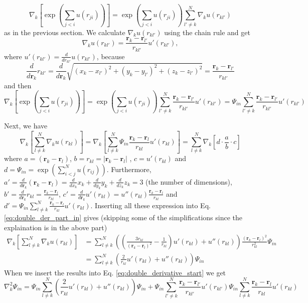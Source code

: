 $$\nabla_k\left[ \exp{\left(\sum_{j<i}u(r_{ji})\right)}\right]=  \exp{\left(\sum_{j<i}u(r_{ji})\right)} \sum^N_{l' \neq k} \nabla_k u (r_{kl'})$$ as in the previous section. We calculate $ \nabla_k u(r_{kl'})$ using the chain rule and get
$$ \nabla_k u(r_{kl'})  = \frac{\mathbf{r}_k - \mathbf{r}_{l'}}{r_{kl'}} u'(r_{kl'}), $$ where $u'(r_{kl'}) = \frac{d}{dr_{kl'}}u(r_{kl'})$, because $$\frac{d}{d\mathbf{r}_{k}}r_{kl'} =\frac{d}{d\mathbf{r}_k}\sqrt{(x_k-x_{l'})^2 + (y_k-y_{l'})^2 + (z_k-z_{l'})^2} = \frac{\mathbf{r}_k - \mathbf{r}_{l'}}{r_{kl'}} $$ and then
$$\nabla_k\left[ \exp{\left(\sum_{j<i}u(r_{ji})\right)}\right]=  \exp{\left(\sum_{j<i}u(r_{ji})\right)} \sum^N_{l' \neq k} \frac{\mathbf{r}_k - \mathbf{r}_{l'}}{r_{kl'}} u'(r_{kl'}) = \Psi_{in} \sum^N_{l' \neq k} \frac{\mathbf{r}_k - \mathbf{r}_{l'}}{r_{kl'}} u'(r_{kl'})  $$

Next, we have
\begin{equation}\label{eq:double_der_part_in}
\nabla_k\left[ \sum^N_{l \neq k} \nabla_k u (r_{kl})\right] = \nabla_k \left[ \sum^N_{l \neq k}  \Psi_{in} \frac{\mathbf{r}_k - \mathbf{r}_{l}}{r_{kl}} u'(r_{kl}) \right] = \sum^N_{l \neq k} \nabla_k \left[ d \cdot \frac{a}{b} \cdot c \right]
\end{equation}
where $a = \left(\mathbf{r}_k-\mathbf{r}_{l}\right)$, $b= r_{kl}=|\mathbf{r}_k-\mathbf{r}_{l}|$ , $c = u'(r_{kl})$ and $d = \Psi_{in}= \exp\left(\sum_{i<j}^N u(r_{ij})\right)$. Furthermore, $a' = \frac{d}{d\mathbf{r}_k} \left(\mathbf{r}_k-\mathbf{r}_{l}\right) = \frac{d}{dx_k} x_k  + \frac{d}{dy_k} y_k  +\frac{d}{dz_k} z_k   = 3$ (the number of dimensions), $b' = \frac{d}{d\mathbf{r}_k} r_{kl} = \frac{\mathbf{r}_k - \mathbf{r}_{l}}{r_{kl}}$, $c' = \frac{d}{d\mathbf{r}_k} u'(r_{kl}) =  u''(r_{kl})\frac{\mathbf{r}_k - \mathbf{r}_{l}}{r_{kl}}$ and $d' = \Psi_{in} \sum^N_{l \neq k} \frac{\mathbf{r}_k - \mathbf{r}_{l}}{r_{kl}} u'(r_{kl})$. Inserting all these expression into Eq. \ref{eq:double_der_part_in} gives (skipping some of the simplifications since the explaination is in the above part)
\begin{align}
\nabla_k\left[ \sum^N_{l \neq k} \nabla_k u (r_{kl})\right] &= \sum^N_{l \neq k} \left( \left(\frac{3r_{kl}}{\left(\mathbf{r}_k-\mathbf{r}_{l}\right)^2}-\frac{1}{r_{kl}}\right)u'(r_{kl}) + u''(r_{kl})\right) \frac{\left(\mathbf{r}_k-\mathbf{r}_{l}\right)^2}{r_{kl}^2} \Psi_{in} \\ \label{eq:doble_der_u}
&= \sum^N_{l \neq k} \left( \frac{2}{r_{kl}}u'(r_{kl}) + u''(r_{kl})\right) \Psi_{in}
\end{align}
When we insert the results into Eq. \ref{eq:double_derivative_start} we get
$$\nabla^2_k\Psi_{in} = \Psi_{in}\sum^N_{l \neq k} \left( \frac{2}{r_{kl}}u'(r_{kl}) + u''(r_{kl})\right) \Psi_{in} +  \Psi_{in} \sum^N_{l' \neq k} \frac{\mathbf{r}_k - \mathbf{r}_{l'}}{r_{kl'}} u'(r_{kl'}) \Psi_{in} \sum^N_{l \neq k} \frac{\mathbf{r}_k - \mathbf{r}_{l}}{r_{kl}} u'(r_{kl})  $$

